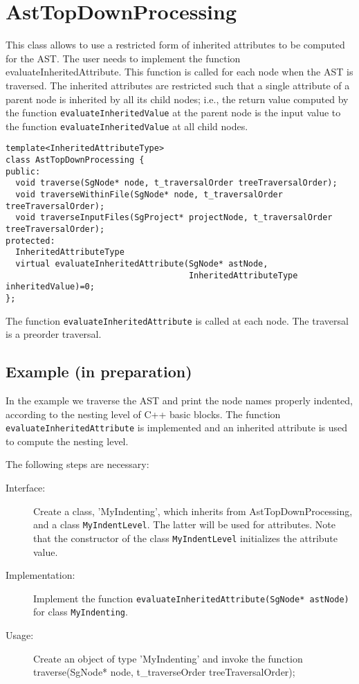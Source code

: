 \section{AstTopDownProcessing}
\label{AstProcessing:AstTopDownProcessing}

This class allows to use a restricted form of inherited attributes to
be computed for the AST. The user needs to implement the function
evaluateInheritedAttribute. This function is called for each node when
the AST is traversed. The inherited attributes are restricted such
that a single attribute of a parent node is inherited by all its child
nodes; i.e., the return value computed by the function {\tt evaluateInheritedValue} at the parent node is the input value to the
function {\tt evaluateInheritedValue} at all child nodes. 

\begin{verbatim}
template<InheritedAttributeType>
class AstTopDownProcessing {
public:
  void traverse(SgNode* node, t_traversalOrder treeTraversalOrder);
  void traverseWithinFile(SgNode* node, t_traversalOrder treeTraversalOrder);
  void traverseInputFiles(SgProject* projectNode, t_traversalOrder treeTraversalOrder);
protected:
  InheritedAttributeType 
  virtual evaluateInheritedAttribute(SgNode* astNode, 
                                     InheritedAttributeType inheritedValue)=0;
};
\end{verbatim}

The function {\tt evaluateInheritedAttribute} is called at each node. The traversal is a preorder traversal.

\subsection{Example (in preparation)}

In the example we traverse the AST and print the node names properly indented, according to the nesting level of C++ basic blocks. The function {\tt evaluateInheritedAttribute} is implemented and an inherited attribute is used to compute the nesting level.

The following steps are necessary:

\begin{description}
\item[Interface:] Create a class, 'MyIndenting', which inherits from AstTopDownProcessing, and a class {\tt MyIndentLevel}. The latter will be used for attributes. Note that the constructor of the class {\tt MyIndentLevel} initializes the attribute value.
\item[Implementation:] Implement the function {\tt evaluateInheritedAttribute(SgNode* astNode)} for class {\tt MyIndenting}.
\item[Usage:] Create an object of type 'MyIndenting' and invoke the function traverse(SgNode* node, t\_traverseOrder treeTraversalOrder);
\end{description}

